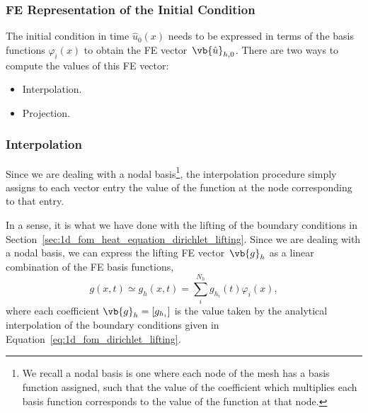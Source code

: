 \documentclass[../main.tex]{subfiles}
\begin{document}
\subsubsection{FE Representation of the Initial Condition}
\label{sec:1d_fom_projection_interpolation}
The initial condition in time $\hat{u}_0(x)$ needs to be expressed in terms of the basis functions $\varphi_i(x)$ to obtain the FE vector~$\vb{\hat{u}}_{h,0}$.
There are two ways to compute the values of this FE vector:
\begin{itemize}
    \item Interpolation.
    \item Projection.
\end{itemize}

\subsubsection*{Interpolation}
Since we are dealing with a nodal basis\footnote{We recall a nodal basis is one where each node of the mesh has a basis function assigned, 
such that the value of the coefficient which multiplies each basis function corresponds to the value of the function at that node.}, 
the interpolation procedure simply assigns to each vector entry the value of the function at the node corresponding to that entry.

In a sense, it is what we have done with the lifting of the boundary conditions in Section~\ref{sec:1d_fom_heat_equation_dirichlet_lifting}.
Since we are dealing with a nodal basis, we can express the lifting FE vector~$\vb{g}_h$ as a linear combination of the FE basis functions,
\begin{equation}
    g(x,t) \simeq g_h(x,t) = \sum_i^{N_h} g_{h_i}(t) \varphi_i(x),
\end{equation}
where each coefficient $\vb{g}_h = [g_{h_i}]$ is the value taken by the analytical interpolation of the boundary conditions given in Equation~\eqref{eq:1d_fom_dirichlet_lifting}. 
\end{document}
